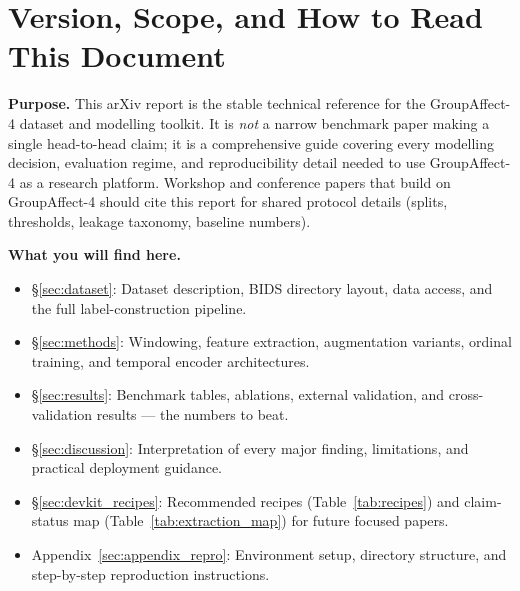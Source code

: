 \documentclass[sigconf,nonacm]{acmart}
\begin{document}

\maketitle

\section*{Version, Scope, and How to Read This Document}
\label{sec:version_scope}

\noindent\textbf{Purpose.}
This arXiv report is the stable technical reference for the GroupAffect-4
dataset and modelling toolkit.
It is \emph{not} a narrow benchmark paper making a single head-to-head claim;
it is a comprehensive guide covering every modelling decision, evaluation
regime, and reproducibility detail needed to use GroupAffect-4 as a research
platform.
Workshop and conference papers that build on GroupAffect-4 should cite this
report for shared protocol details (splits, thresholds, leakage taxonomy,
baseline numbers).

\smallskip\noindent\textbf{What you will find here.}
\begin{itemize}[leftmargin=1.2em,topsep=2pt,itemsep=1pt]
  \item \S\ref{sec:dataset}: Dataset description, BIDS directory layout, data
        access, and the full label-construction pipeline.
  \item \S\ref{sec:methods}: Windowing, feature extraction, augmentation
        variants, ordinal training, and temporal encoder architectures.
  \item \S\ref{sec:results}: Benchmark tables, ablations, external validation,
        and cross-validation results --- the numbers to beat.
  \item \S\ref{sec:discussion}: Interpretation of every major finding,
        limitations, and practical deployment guidance.
  \item \S\ref{sec:devkit_recipes}: Recommended recipes (Table~\ref{tab:recipes})
        and claim-status map (Table~\ref{tab:extraction_map}) for future
        focused papers.
  \item Appendix~\ref{sec:appendix_repro}: Environment setup, directory structure,
        and step-by-step reproduction instructions.
\end{itemize}
\end{document}
